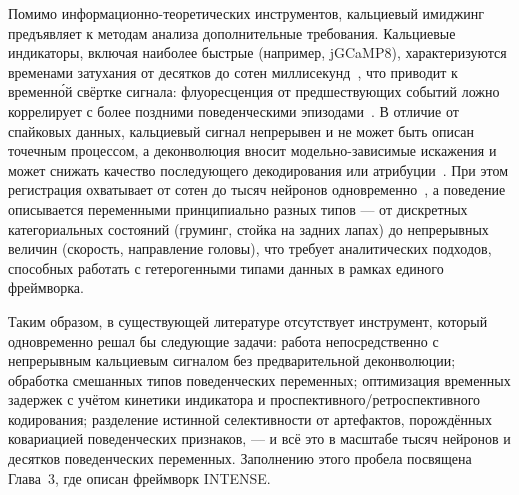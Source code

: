 Помимо информационно-теоретических инструментов, кальциевый имиджинг предъявляет к методам анализа дополнительные требования.
Кальциевые индикаторы, включая наиболее быстрые (например, jGCaMP8), характеризуются временами затухания от десятков до сотен миллисекунд~\cite{Zhang2023}, что приводит к временн\'{о}й свёртке сигнала: флуоресценция от предшествующих событий ложно коррелирует с более поздними поведенческими эпизодами~\cite{Wei2020}.
В отличие от спайковых данных, кальциевый сигнал непрерывен и не может быть описан точечным процессом, а деконволюция вносит модельно-зависимые искажения и может снижать качество последующего декодирования или атрибуции~\cite{Rupprecht2021}.
При этом регистрация охватывает от сотен до тысяч нейронов одновременно~\cite{Chen2013, Zong2022}, а поведение описывается переменными принципиально разных типов --- от дискретных категориальных состояний (груминг, стойка на задних лапах) до непрерывных величин (скорость, направление головы), что требует аналитических подходов, способных работать с гетерогенными типами данных в рамках единого фреймворка.

Таким образом, в существующей литературе отсутствует инструмент, который одновременно решал бы следующие задачи: работа непосредственно с непрерывным кальциевым сигналом без предварительной деконволюции; обработка смешанных типов поведенческих переменных; оптимизация временных задержек с учётом кинетики индикатора и проспективного/ретроспективного кодирования; разделение истинной селективности от артефактов, порождённых ковариацией поведенческих признаков, --- и всё это в масштабе тысяч нейронов и десятков поведенческих переменных. Заполнению этого пробела посвящена Глава~3, где описан фреймворк INTENSE.
